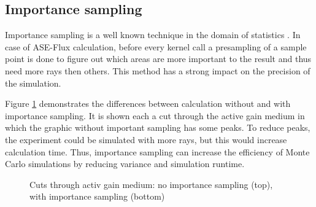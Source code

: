 \subsection{Importance sampling}
\label{subsec:importance_sampling}
Importance sampling is a well known technique in the domain
of statistics \cite{importanceSamplingSource}. In case of 
ASE-Flux calculation, before every kernel call a presampling 
of a sample point is done to figure out which areas are more
important to the result and thus need more rays then others.
This method has a strong impact on the precision of the simulation.

Figure \ref{graphic:importance} demonstrates
the differences between calculation without and with
importance sampling. It is shown each a cut through the active
gain medium in which the graphic without important
sampling has some peaks. To reduce peaks, the experiment
could be simulated with more rays, but this would increase
calculation time. Thus, importance sampling can increase the
efficiency of Monte Carlo simulations by reducing variance 
and simulation runtime. 
\begin{figure}
  \centerline
  {}
  \caption{Cuts through activ gain medium: no importance sampling (top), with importance sampling (bottom)}
  \label{graphic:importance}
\end{figure}

